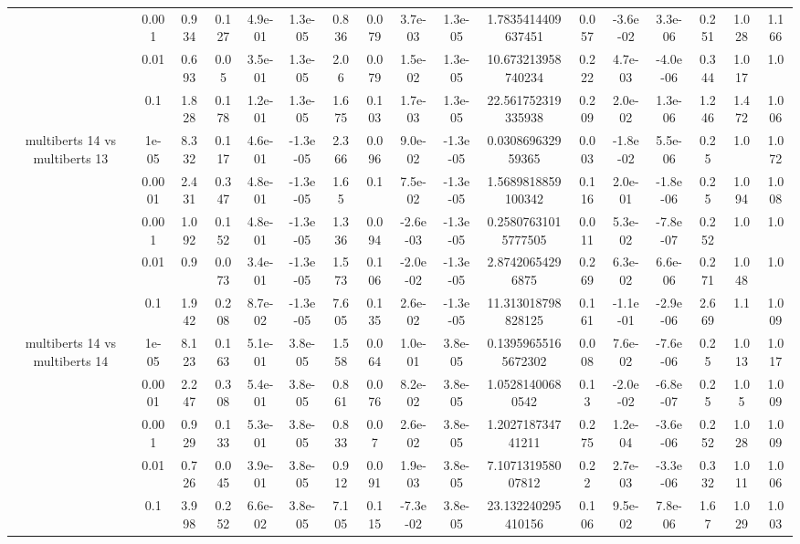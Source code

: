 \begin{tabular}{|c|c|c|c|c|c|c|c|c|c|c|c|c|c|c|c|c|}
 & 0.001 & 0.934 & 0.127 & 4.9e-01 & 1.3e-05 & 0.836 & 0.079 & 3.7e-03 & 1.3e-05 & 1.7835414409637451 & 0.057 & -3.6e-02 & 3.3e-06 & 0.251 & 1.028 & 1.166 \\
 & 0.01 & 0.693 & 0.05 & 3.5e-01 & 1.3e-05 & 2.06 & 0.079 & 1.5e-02 & 1.3e-05 & 10.673213958740234 & 0.222 & 4.7e-03 & -4.0e-06 & 0.344 & 1.017 & 1.0 \\
 & 0.1 & 1.828 & 0.178 & 1.2e-01 & 1.3e-05 & 1.675 & 0.103 & 1.7e-03 & 1.3e-05 & 22.561752319335938 & 0.209 & 2.0e-02 & 1.3e-06 & 1.246 & 1.472 & 1.006 \\
\hline
\multirow{5}{*}{multiberts 14 vs multiberts 13} & 1e-05 & 8.332 & 0.117 & 4.6e-01 & -1.3e-05 & 2.366 & 0.096 & 9.0e-02 & -1.3e-05 & 0.030869632959365 & 0.003 & -1.8e-02 & 5.5e-06 & 0.25 & 1.0 & 1.072 \\
 & 0.0001 & 2.431 & 0.347 & 4.8e-01 & -1.3e-05 & 1.65 & 0.1 & 7.5e-02 & -1.3e-05 & 1.5689818859100342 & 0.116 & 2.0e-01 & -1.8e-06 & 0.25 & 1.094 & 1.008 \\
 & 0.001 & 1.092 & 0.152 & 4.8e-01 & -1.3e-05 & 1.336 & 0.094 & -2.6e-03 & -1.3e-05 & 0.25807631015777505 & 0.011 & 5.3e-02 & -7.8e-07 & 0.252 & 1.0 & 1.0 \\
 & 0.01 & 0.9 & 0.073 & 3.4e-01 & -1.3e-05 & 1.573 & 0.106 & -2.0e-02 & -1.3e-05 & 2.87420654296875 & 0.269 & 6.3e-02 & 6.6e-06 & 0.271 & 1.048 & 1.0 \\
 & 0.1 & 1.942 & 0.208 & 8.7e-02 & -1.3e-05 & 7.605 & 0.135 & 2.6e-02 & -1.3e-05 & 11.313018798828125 & 0.161 & -1.1e-01 & -2.9e-06 & 2.669 & 1.1 & 1.009 \\
\hline
\multirow{5}{*}{multiberts 14 vs multiberts 14} & 1e-05 & 8.123 & 0.163 & 5.1e-01 & 3.8e-05 & 1.558 & 0.064 & 1.0e-01 & 3.8e-05 & 0.13959655165672302 & 0.008 & 7.6e-02 & -7.6e-06 & 0.25 & 1.013 & 1.017 \\
 & 0.0001 & 2.247 & 0.308 & 5.4e-01 & 3.8e-05 & 0.861 & 0.076 & 8.2e-02 & 3.8e-05 & 1.05281400680542 & 0.13 & -2.0e-02 & -6.8e-07 & 0.25 & 1.05 & 1.009 \\
 & 0.001 & 0.929 & 0.133 & 5.3e-01 & 3.8e-05 & 0.833 & 0.07 & 2.6e-02 & 3.8e-05 & 1.202718734741211 & 0.275 & 1.2e-04 & -3.6e-06 & 0.252 & 1.028 & 1.009 \\
 & 0.01 & 0.726 & 0.045 & 3.9e-01 & 3.8e-05 & 0.912 & 0.091 & 1.9e-03 & 3.8e-05 & 7.107131958007812 & 0.22 & 2.7e-03 & -3.3e-06 & 0.332 & 1.011 & 1.006 \\
 & 0.1 & 3.998 & 0.252 & 6.6e-02 & 3.8e-05 & 7.105 & 0.115 & -7.3e-02 & 3.8e-05 & 23.132240295410156 & 0.106 & 9.5e-02 & 7.8e-06 & 1.67 & 1.029 & 1.003 \\

\end{tabular}
